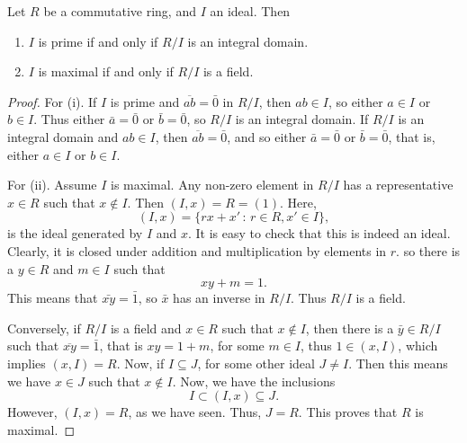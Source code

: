 \documentclass[10pt, a4paper]{article}
\begin{document}
\begin{theorem}
    Let $R$ be a commutative ring,
    and $I$ an ideal.
    Then
    \begin{enumerate}[label = \roman*)]
        \item $I$ is prime if and only if $R / I$ is an integral domain.

        \item $I$ is maximal if and only if $R / I$ is a field.
    \end{enumerate}

    \begin{proof}
        For (i).
        If $I$ is prime and $\overline{ab} = \bar{0}$ in $R / I$,
        then $ab \in I$,
        so either $a \in I$ or $b \in I$.
        Thus either $\bar{a} = \bar{0}$ or $\bar{b} = \bar{0}$,
        so $R / I$ is an integral domain.
        If $R / I$ is an integral domain and $ab \in I$,
        then $\overline{ab} = \bar{0}$,
        and so either $\bar{a} = \bar{0}$ or $\bar{b} = \bar{0}$,
        that is,
        either $a \in I$ or $b \in I$.

        For (ii).
        Assume $I$ is maximal.
        Any non-zero element in $R / I$ has a representative $x \in R$ such that $x \notin I$.
        Then $(I, x) = R = (1)$.
        Here,
        \[
        (I, x) = \{rx + x'\,:\, r \in R, x' \in I\},
        \]
        is the ideal generated by $I$ and $x$.
        It is easy to check that this is indeed an ideal.
        Clearly,
        it is closed under addition and multiplication by elements in $r$.
        so there is a $y \in R$ and $m \in I$ such that
        \[
        xy + m = 1.
        \]
        This means that $\bar{xy} = \bar{1}$,
        so $\bar{x}$ has an inverse in $R / I$.
        Thus $R / I$ is a field.

        Conversely,
        if $R / I$ is a field and $x \in R$ such that $x \notin I$,
        then there is a $\bar{y} \in R / I$ such that $\overline{xy} = \bar{1}$,
        that is $xy = 1 + m$,
        for some $m \in I$,
        thus $1 \in (x, I)$,
        which implies $(x, I) = R$.
        Now,
        if $I \subseteq J$,
        for some other ideal $J \neq I$.
        Then this means we have $x \in J$ such that $x \notin I$.
        Now,
        we have the inclusions
        \[
        I \subset (I, x) \subseteq J.
        \]
        However,
        $(I, x) = R$,
        as we have seen.
        Thus,
        $J = R$.
        This proves that $R$ is maximal.
    \end{proof}
\end{theorem}
\end{document}
